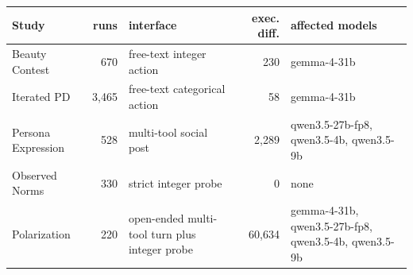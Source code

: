 \begin{tabular}{lrlrl}
\toprule
Study & runs & interface & exec. diff. & affected models \\
\midrule
Beauty Contest & 670 & free-text integer action & 230 & gemma-4-31b \\
Iterated PD & 3,465 & free-text categorical action & 58 & gemma-4-31b \\
Persona Expression & 528 & multi-tool social post & 2,289 & qwen3.5-27b-fp8, qwen3.5-4b, qwen3.5-9b \\
Observed Norms & 330 & strict integer probe & 0 & none \\
Polarization & 220 & open-ended multi-tool turn plus integer probe & 60,634 & gemma-4-31b, qwen3.5-27b-fp8, qwen3.5-4b, qwen3.5-9b \\
\bottomrule
\end{tabular}